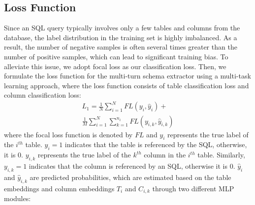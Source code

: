 \documentclass[11pt]{article}
\begin{document}

\subsection{Loss Function}
\label{sec:loss function}
Since an SQL query typically involves only a few tables and columns from the database, the label distribution in the training set is highly imbalanced. As a result, the number of negative samples is often several times greater than the number of positive samples, which can lead to significant training bias. To alleviate this issue, we adopt focal loss \cite{ross2017focal} as our classification loss. Then, we formulate the loss function for the multi-turn schema extractor using a multi-task learning approach, where the loss function consists of table classification loss and column classification loss:
\begin{equation}
\begin{split}
    L_{1}=\frac{1}{N}\sum_{i=1}^{N}FL(y_{i},\hat{y}_{i})+\\\frac{1}{M}\sum_{i=1}^{N} \sum_{k=1}^{n_{i}}FL(y_{i,k},\hat{y}_{i,k})
\end{split}
\end{equation}
where the focal loss function is denoted by $ FL $ and $ y_{i} $ represents the true label of the $ i^{th} $ table. $ y_{i} = 1 $ indicates that the table is referenced by the SQL, otherwise, it is 0. $y_{i,k}$ represents the true label of the $k^{th}$ column in the $i^{th}$ table. Similarly, $y_{i,k} = 1$ indicates that the column is referenced by an SQL, otherwise it is 0. $\hat{y}_{i}$ and $\hat{y}_{i,k}$ are predicted probabilities, which are estimated based on the table embeddings and column embeddings $T_{i}$ and $C_{i,k}$ through two different MLP modules:
\end{document}
